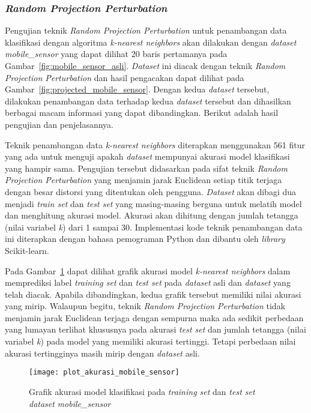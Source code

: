 \subsubsection{\textit{Random Projection Perturbation}}
\label{subsubsec:pengujian-klasifikasi-rpp}

Pengujian teknik \textit{Random Projection Perturbation} untuk penambangan data klasifikasi dengan algoritma \textit{k-nearest neighbors} akan dilakukan dengan \textit{dataset} \textit{mobile\_sensor} yang dapat dilihat 20 baris pertamanya pada Gambar~\ref{fig:mobile_sensor_asli}. \textit{Dataset} ini diacak dengan teknik \textit{Random Projection Perturbation} dan hasil pengacakan dapat dilihat pada Gambar~\ref{fig:projected_mobile_sensor}. Dengan kedua \textit{dataset} tersebut, dilakukan penambangan data terhadap kedua \textit{dataset} tersebut dan dihasilkan berbagai macam informasi yang dapat dibandingkan. Berikut adalah hasil pengujian dan penjelasannya.

Teknik penambangan data \textit{k-nearest neighbors} diterapkan menggunakan 561 fitur yang ada untuk menguji apakah \textit{dataset} mempunyai akurasi model klasifikasi yang hampir sama. Pengujian tersebut didasarkan pada sifat teknik \textit{Random Projection Perturbation} yang menjamin jarak Euclidean setiap titik terjaga dengan besar distorsi yang ditentukan oleh pengguna. \textit{Dataset} akan dibagi dua menjadi \textit{train set} dan \textit{test set} yang masing-masing berguna untuk melatih model dan menghitung akurasi model. Akurasi akan dihitung dengan jumlah tetangga (nilai variabel \textit{k}) dari 1 sampai 30. Implementasi kode teknik penambangan data ini diterapkan dengan bahasa pemograman Python dan dibantu oleh \textit{library} Scikit-learn.

Pada Gambar~\ref{fig:plot_akurasi_mobile_sensor} dapat dilihat grafik akurasi model \textit{k-nearest neighbors} dalam memprediksi label \textit{training set} dan \textit{test set} pada \textit{dataset} asli dan \textit{dataset} yang telah diacak. Apabila dibandingkan, kedua grafik tersebut memiliki nilai akurasi yang mirip. Walaupun begitu, teknik \textit{Random Projection Perturbation} tidak menjamin jarak Euclidean terjaga dengan sempurna maka ada sedikit perbedaan yang lumayan terlihat khususnya pada akurasi \textit{test set} dan jumlah tetangga (nilai variabel \textit{k}) pada model yang memiliki akurasi tertinggi. Tetapi perbedaan nilai akurasi tertingginya masih mirip dengan \textit{dataset} asli. 
	
\begin{figure}
	\centering
	\texttt{[image: plot\_akurasi\_mobile\_sensor]}
	\caption{Grafik akurasi model klasifikasi pada \textit{training set} dan \textit{test set} \textit{dataset} \textit{mobile\_sensor}}
	\label{fig:plot_akurasi_mobile_sensor}
\end{figure}

